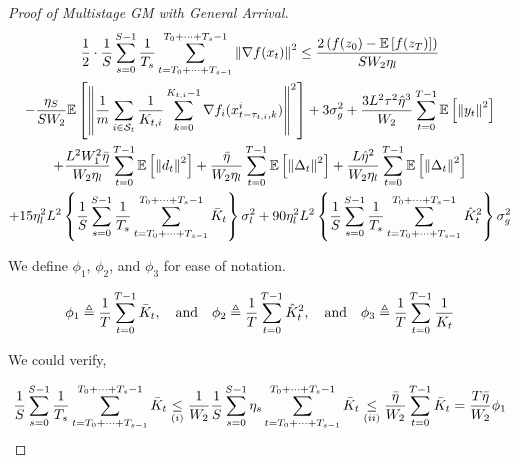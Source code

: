 \begin{proof}[Proof of Multistage GM with General Arrival]
\begin{equation}
\begin{gathered}
\frac{1}{2} \cdot \frac{1}{S}\sum_{s=0}^{S-1} \frac{1}{T_s}\sum_{t=T_0+\dots+T_{s-1} }^{T_0+\dots+T_s-1} \left\|\nabla f(x_t)\right\|^2
\leq \frac{2\left(f(z_0) - \mathbb{E}\left[f(z_{T})\right]  \right)}{S W_2 \eta_l} \\
- \frac{\eta_S}{S W_2} \mathbb{E}\left[\left\| \frac{1}{m}\sum_{i\in\mathcal{S}_t} \frac{1}{K_{t,i}} \sum_{k=0}^{K_{t,i}-1} \nabla f_i(x_{t-\tau_{t,i},k}^i) \right\|^2\right] + 3 \sigma_g^2
+ \frac{3 L^2 \tau^2 \hat{\eta}^3}{W_2} \sum_{t=0}^{T-1}\mathbb{E}\left[\left\|  y_t \right\|^2\right] \\
+ \frac{L^2 W_1^2 \Bar{\eta}}{W_2 \eta_l} \sum_{t=0}^{T-1}\mathbb{E}\left[\left\| d_t\right\|^2\right] + \frac{\Bar{\eta}}{W_2 \eta_l} \sum_{t=0}^{T-1} \mathbb{E}\left[\left\|\Delta_t\right\|^2\right]  + \frac{L \hat{\eta}^2}{W_2 \eta_l} \sum_{t=0}^{T-1} \mathbb{E}\left[\left\| \Delta_t\right\|^2\right]\\
+ 15 \eta^2_l L^2 \left\{\frac{1}{S}\sum_{s=0}^{S-1} \frac{1}{T_s}\sum_{t=T_0+\dots+T_{s-1} }^{T_0+\dots+T_s-1} \Bar{K}_t\right\} \sigma_l^2 + 90 \eta^2_l L^2 \left\{\frac{1}{S}\sum_{s=0}^{S-1} \frac{1}{T_s}\sum_{t=T_0+\dots+T_{s-1} }^{T_0+\dots+T_s-1} \hat{K}_t^2 \right\} \sigma_g^2
\end{gathered}\nonumber
\end{equation}


We define $\phi_1$, $\phi_2$, and $\phi_3$ for ease of notation.

\begin{equation}
\begin{gathered}
\phi_1 \triangleq  \frac{1}{T}\sum_{t=0}^{T-1} \Bar{K}_t,  \quad \text{and} \quad  \phi_2 \triangleq  \frac{1}{T}\sum_{t=0}^{T-1} \hat{K}_t^2 ,  \quad \text{and} \quad 
\phi_3 \triangleq \frac{1}{T}\sum_{t=0}^{T-1} \frac{1}{K_t}
\end{gathered}\nonumber
\end{equation}

We could verify,

\begin{equation}
\begin{gathered}
\frac{1}{S}\sum_{s=0}^{S-1} \frac{1}{T_s}\sum_{t=T_0+\dots+T_{s-1} }^{T_0+\dots+T_s-1} \Bar{K}_t \underset{(i)}{\leq} \frac{1}{W_2} \frac{1}{S}\sum_{s=0}^{S-1} \eta_s \sum_{t=T_0+\dots+T_{s-1} }^{T_0+\dots+T_s-1} \Bar{K}_t \underset{(ii)}{\leq} \frac{\Bar{\eta}}{W_2} \sum_{t=0}^{T-1}\Bar{K}_t = \frac{T \Bar{\eta}}{W_2} \phi_1
\end{gathered}\nonumber
\end{equation}


\end{proof}
